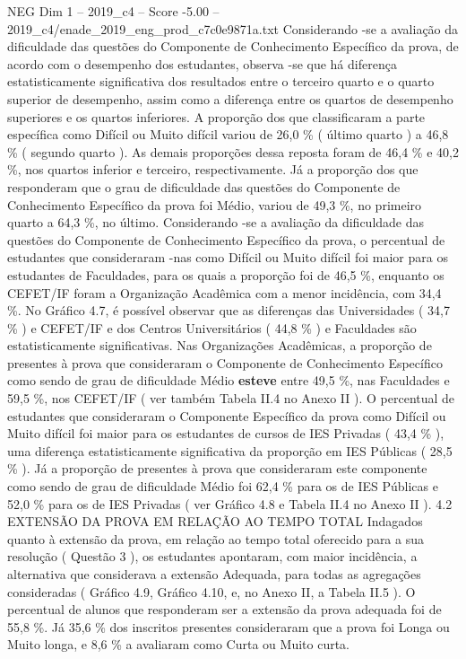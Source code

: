 \begin{textsample}{NEG Dim 1 – 2019\_c4 – Score -5.00 – 2019\_c4/enade\_2019\_eng\_prod\_c7c0e9871a.txt}
Considerando -se a avaliação da dificuldade das questões do Componente de Conhecimento Específico da prova, de acordo com o desempenho dos estudantes, observa -se que há diferença estatisticamente significativa dos resultados entre o terceiro quarto e o quarto superior de desempenho, assim como a diferença entre os quartos de desempenho superiores e os quartos inferiores.
A proporção dos que classificaram a parte específica como Difícil ou Muito difícil variou de 26,0 \% ( último quarto ) a 46,8 \% ( segundo quarto ).
As demais proporções dessa reposta foram de 46,4 \% e 40,2 \%, nos quartos inferior e terceiro, respectivamente.
Já a proporção dos que responderam que o grau de dificuldade das questões do Componente de Conhecimento Específico da prova foi Médio, variou de 49,3 \%, no primeiro quarto a 64,3 \%, no último.
Considerando -se a avaliação da dificuldade das questões do Componente de Conhecimento Específico da prova, o percentual de estudantes que consideraram -nas como Difícil ou Muito difícil foi maior para os estudantes de Faculdades, para os quais a proporção foi de 46,5 \%, enquanto os CEFET/IF foram a Organização Acadêmica com a menor incidência, com 34,4 \%.
No Gráfico 4.7, é possível observar que as diferenças das Universidades ( 34,7 \% ) e CEFET/IF e dos Centros Universitários ( 44,8 \% ) e Faculdades são estatisticamente significativas.
Nas Organizações Acadêmicas, a proporção de presentes à prova que consideraram o Componente de Conhecimento Específico como sendo de grau de dificuldade Médio \textbf{esteve} entre 49,5 \%, nas Faculdades e 59,5 \%, nos CEFET/IF ( ver também Tabela II.4 no Anexo II ).
O percentual de estudantes que consideraram o Componente Específico da prova como Difícil ou Muito difícil foi maior para os estudantes de cursos de IES Privadas ( 43,4 \% ), uma diferença estatisticamente significativa da proporção em IES Públicas ( 28,5 \% ).
Já a proporção de presentes à prova que consideraram este componente como sendo de grau de dificuldade Médio foi 62,4 \% para os de IES Públicas e 52,0 \% para os de IES Privadas ( ver Gráfico 4.8 e Tabela II.4 no Anexo II ). 4.2 EXTENSÃO DA PROVA EM RELAÇÃO AO TEMPO TOTAL Indagados quanto à extensão da prova, em relação ao tempo total oferecido para a sua resolução ( Questão 3 ), os estudantes apontaram, com maior incidência, a alternativa que considerava a extensão Adequada, para todas as agregações consideradas ( Gráfico 4.9, Gráfico 4.10, e, no Anexo II, a Tabela II.5 ).
O percentual de alunos que responderam ser a extensão da prova adequada foi de 55,8 \%.
Já 35,6 \% dos inscritos presentes consideraram que a prova foi Longa ou Muito longa, e 8,6 \% a avaliaram como Curta ou Muito curta.

\end{textsample}
